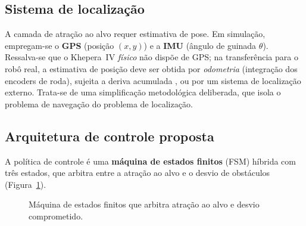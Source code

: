 \documentclass[11pt,a4paper]{article}
\begin{document}
\subsection{Sistema de localização}
A camada de atração ao alvo requer estimativa de pose. Em simulação, empregam-se o \textbf{GPS} (posição $(x,y)$) e a \textbf{IMU} (ângulo de guinada $\theta$). Ressalva-se que o Khepera~IV \emph{físico} não dispõe de GPS; na transferência para o robô real, a estimativa de posição deve ser obtida por \emph{odometria} (integração dos encoders de roda), sujeita a deriva acumulada \cite{siegwart2011}, ou por um sistema de localização externo. Trata-se de uma simplificação metodológica deliberada, que isola o problema de navegação do problema de localização.

\subsection{Arquitetura de controle proposta}
A política de controle é uma \textbf{máquina de estados finitos} (FSM) híbrida com três estados, que arbitra entre a atração ao alvo e o desvio de obstáculos (Figura~\ref{fig:fsm}).

\begin{figure}[H]
\centering
{}
\caption{Máquina de estados finitos que arbitra atração ao alvo e desvio comprometido.}
\label{fig:fsm}
\end{figure}
\end{document}
